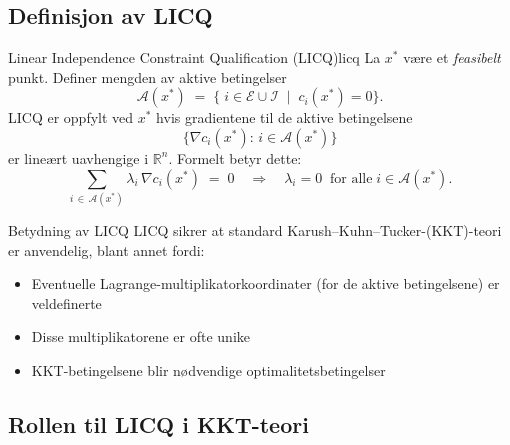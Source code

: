 \subsection{Definisjon av LICQ}

\begin{definition}{Linear Independence Constraint Qualification (LICQ)}{licq}
	La $x^*$ være et \emph{feasibelt} punkt. Definer mengden av aktive betingelser
	\[
		\mathcal{A}(x^*) \;=\; \{\; i \in \mathcal{E} \cup \mathcal{I} \;\mid\; c_i(x^*) = 0 \}.
	\]
	LICQ er oppfylt ved $x^*$ hvis gradientene til de aktive betingelsene
	\[
		\{\nabla c_i(x^*) :\, i \in \mathcal{A}(x^*)\}
	\]
	er lineært uavhengige i $\mathbb{R}^n$. Formelt betyr dette:
	\[
		\sum_{i \,\in\, \mathcal{A}(x^*)} \lambda_i \,\nabla c_i(x^*) \;=\; 0
		\quad \Longrightarrow \quad
		\lambda_i = 0 \;\;\text{for alle}\; i \in \mathcal{A}(x^*).
	\]
\end{definition}

\begin{remark}{Betydning av LICQ}{}
	LICQ sikrer at standard Karush--Kuhn--Tucker-(KKT)-teori er anvendelig, blant annet fordi:
	\begin{itemize}
		\item Eventuelle Lagrange-multiplikatorkoordinater (for de aktive betingelsene) er veldefinerte
		\item Disse multiplikatorene er ofte unike
		\item KKT-betingelsene blir nødvendige optimalitetsbetingelser
	\end{itemize}
\end{remark}

\subsection{Rollen til LICQ i KKT-teori}

